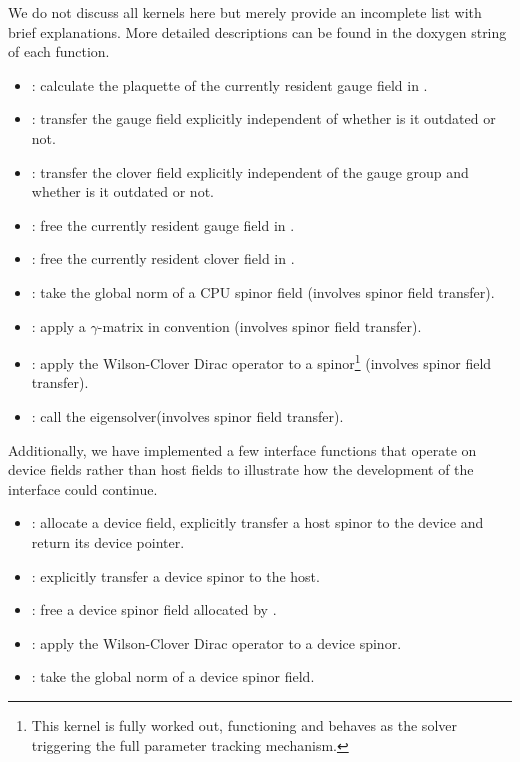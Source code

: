We do not discuss all kernels here but merely provide an incomplete list with brief explanations. More detailed descriptions can be found in the doxygen string of each function.
\begin{itemize}
  \item {}: calculate the plaquette of the currently resident gauge field in \quda.
  \item {}: transfer the gauge field explicitly independent of whether is it outdated or not.
  \item {}: transfer the clover field explicitly independent of the gauge group and whether is it outdated or not.
  \item {}: free the currently resident gauge field in \quda.
  \item {}: free the currently resident clover field in \quda.
  \item {}: take the global norm of a CPU spinor field (involves spinor field transfer).
  \item {}: apply a $\gamma$-matrix in \openqxd convention (involves spinor field transfer).
  \item {}: apply the Wilson-Clover Dirac operator to a spinor\footnote{This kernel is fully worked out, functioning and behaves as the solver triggering the full parameter tracking mechanism.} (involves spinor field transfer).
  \item {}: call the eigensolver\footnotemark[\value{footnote}] (involves spinor field transfer).
\end{itemize}

Additionally, we have implemented a few interface functions that operate on device fields rather than host fields to illustrate how the development of the interface could continue.
\begin{itemize}
  \item {}: allocate a device field, explicitly transfer a host spinor to the device and return its device pointer.
  \item {}: explicitly transfer a device spinor to the host.
  \item {}: free a device spinor field allocated by .
  \item {}: apply the Wilson-Clover Dirac operator to a device spinor\footnotemark[\value{footnote}].
  \item {}: take the global norm of a device spinor field.
\end{itemize}

